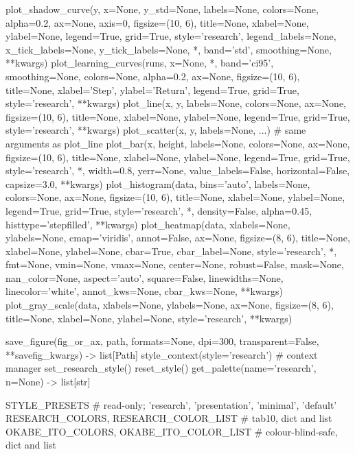 \begin{pycode}
plot_shadow_curve(y, x=None, y_std=None, labels=None, colors=None, alpha=0.2,
                  ax=None, axis=0, figsize=(10, 6), title=None, xlabel=None,
                  ylabel=None, legend=True, grid=True, style='research',
                  legend_labels=None, x_tick_labels=None, y_tick_labels=None,
                  *, band='std', smoothing=None, **kwargs)
plot_learning_curves(runs, x=None, *, band='ci95', smoothing=None, colors=None,
                     alpha=0.2, ax=None, figsize=(10, 6), title=None,
                     xlabel='Step', ylabel='Return', legend=True, grid=True,
                     style='research', **kwargs)
plot_line(x, y, labels=None, colors=None, ax=None, figsize=(10, 6), title=None,
          xlabel=None, ylabel=None, legend=True, grid=True, style='research',
          **kwargs)
plot_scatter(x, y, labels=None, ...)       # same arguments as plot_line
plot_bar(x, height, labels=None, colors=None, ax=None, figsize=(10, 6),
         title=None, xlabel=None, ylabel=None, legend=True, grid=True,
         style='research', *, width=0.8, yerr=None, value_labels=False,
         horizontal=False, capsize=3.0, **kwargs)
plot_histogram(data, bins='auto', labels=None, colors=None, ax=None,
               figsize=(10, 6), title=None, xlabel=None, ylabel=None,
               legend=True, grid=True, style='research', *, density=False,
               alpha=0.45, histtype='stepfilled', **kwargs)
plot_heatmap(data, xlabels=None, ylabels=None, cmap='viridis', annot=False,
             ax=None, figsize=(8, 6), title=None, xlabel=None, ylabel=None,
             cbar=True, cbar_label=None, style='research', *, fmt=None,
             vmin=None, vmax=None, center=None, robust=False, mask=None,
             nan_color=None, aspect='auto', square=False, linewidths=None,
             linecolor='white', annot_kws=None, cbar_kws=None, **kwargs)
plot_gray_scale(data, xlabels=None, ylabels=None, ax=None, figsize=(8, 6),
                title=None, xlabel=None, ylabel=None, style='research',
                **kwargs)

save_figure(fig_or_ax, path, formats=None, dpi=300, transparent=False,
            **savefig_kwargs) -> list[Path]
style_context(style='research')           # context manager
set_research_style()
reset_style()
get_palette(name='research', n=None) -> list[str]

STYLE_PRESETS          # read-only; 'research', 'presentation', 'minimal', 'default'
RESEARCH_COLORS, RESEARCH_COLOR_LIST          # tab10, dict and list
OKABE_ITO_COLORS, OKABE_ITO_COLOR_LIST        # colour-blind-safe, dict and list
\end{pycode}

